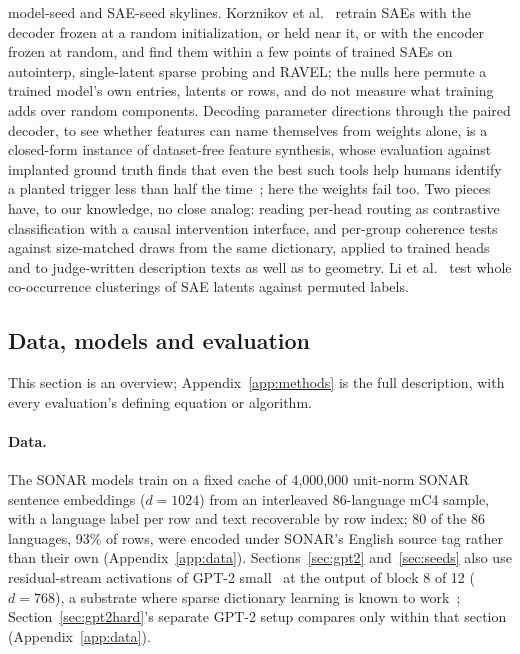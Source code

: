\documentclass[11pt]{article}
\begin{document}
model-seed and SAE-seed skylines. Korznikov et al.~\cite{korznikov2026}
retrain SAEs with the decoder frozen at a random initialization, or held
near it, or with the encoder frozen at random, and find them within a few
points of trained SAEs on autointerp, single-latent sparse probing and
RAVEL; the nulls here permute a trained model's own entries, latents or
rows, and do not measure what training adds over random components.
Decoding parameter directions through the paired decoder, to see whether
features can name themselves from weights alone, is a closed-form
instance of dataset-free feature synthesis, whose evaluation against
implanted ground truth finds that even the best such tools help humans
identify a planted trigger less than half the time~\cite{casper2023};
here the weights fail too. Two pieces have, to our knowledge, no close
analog: reading per-head routing as contrastive classification with a
causal intervention interface, and per-group coherence tests against
size-matched draws from the same dictionary, applied to trained heads and
to judge-written description texts as well as to geometry. Li et
al.~\cite{li2024geometry} test whole co-occurrence clusterings of SAE
latents against permuted labels.



\subsection{Data, models and evaluation}
\label{sec:setup}

This section is an overview; Appendix~\ref{app:methods} is the full
description, with every evaluation's defining equation or algorithm.

\paragraph{Data.}
The SONAR models train on a fixed cache of 4{,}000{,}000 unit-norm SONAR
sentence embeddings ($d{=}1024$) from an interleaved 86-language mC4
sample, with a language label per row and text recoverable by row index;
80 of the 86 languages, 93\% of rows, were encoded under SONAR's English
source tag rather than their own (Appendix~\ref{app:data}).
Sections~\ref{sec:gpt2} and~\ref{sec:seeds} also use residual-stream
activations of GPT-2 small~\cite{radford2019} at the output of block 8 of
12 ($d{=}768$), a substrate where sparse dictionary learning is known to
work~\cite{gao2024}; Section~\ref{sec:gpt2hard}'s
separate GPT-2 setup compares only within that section
(Appendix~\ref{app:data}).
\end{document}
